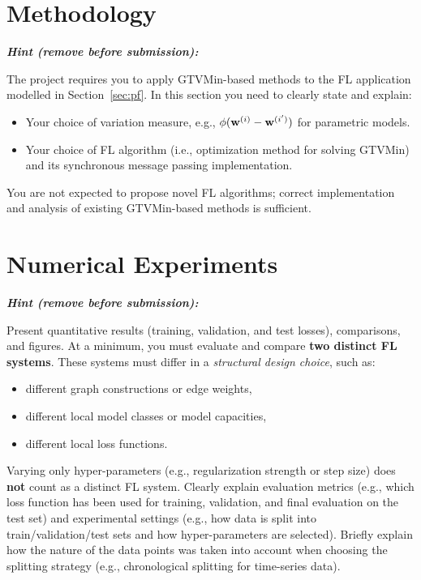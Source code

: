\documentclass{article}
\newenvironment{hint}{%
	\par\medskip\noindent
	\begin{minipage}[t]{\dimexpr\columnwidth-8mm}%
	\raggedright\itshape
	\textbf{Hint (remove before submission):}\space
}{%
	\end{minipage}\par\medskip
}
\begin{document}
\section{Methodology}
\label{sec:meth}
\begin{hint}
The project requires you to apply GTVMin-based methods to
the FL application modelled in Section~\ref{sec:pf}. In this section
you need to clearly state and explain:
\begin{itemize}
	\item Your choice of variation measure, e.g., $\phi(\mathbf{w}^{(i)}-\mathbf{w}^{(i')})$
	for parametric models.
	\item Your choice of FL algorithm (i.e., optimization method for solving
	GTVMin) and its synchronous message passing implementation.
\end{itemize}
You are not expected to propose novel FL algorithms; correct implementation and
analysis of existing GTVMin-based methods is sufficient.
\end{hint}


\section{Numerical Experiments}
\label{sec:experiments}

\begin{hint}
	Present quantitative results (training, validation, and test losses),
	comparisons, and figures.
	At a minimum, you must evaluate and compare \textbf{two distinct FL systems}.
	These systems must differ in a \emph{structural design choice}, such as:
	\begin{itemize}
		\item different graph constructions or edge weights,
		\item different local model classes or model capacities,
		\item different local loss functions.
	\end{itemize}
	Varying only hyper-parameters (e.g., regularization strength or step size)
	does \textbf{not} count as a distinct FL system.
	Clearly explain evaluation metrics (e.g., which loss function has been used
	for training, validation, and final evaluation on the test set) and experimental
	settings (e.g., how data is split into train/validation/test sets and how hyper-parameters
	are selected). Briefly explain how the nature of the data points was taken into
	account when choosing the splitting strategy (e.g., chronological splitting
	for time-series data).
\end{hint}
\end{document}
